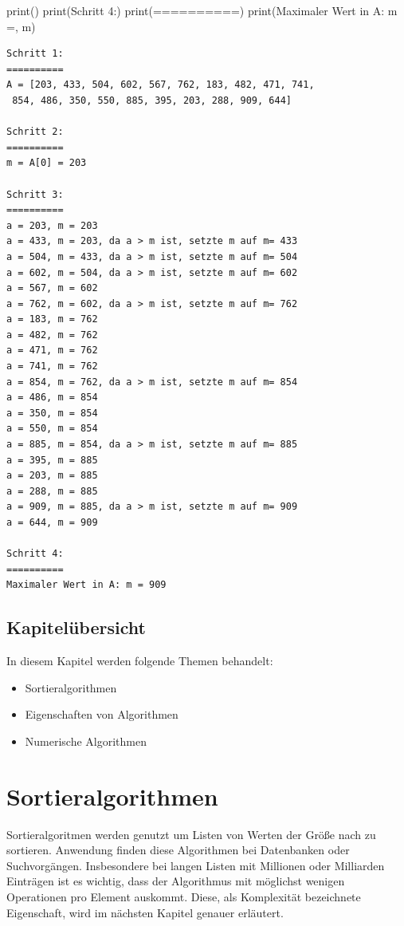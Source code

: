 \documentclass[
  letterpaper,
  DIV=11,
  numbers=noendperiod]{scrreprt}
\newenvironment{Shaded}{\begin{snugshade}}{\end{snugshade}}
\newcommand{\BuiltInTok}[1]{\textcolor[rgb]{0.00,0.23,0.31}{#1}}
\newcommand{\NormalTok}[1]{\textcolor[rgb]{0.00,0.23,0.31}{#1}}
\newcommand{\StringTok}[1]{\textcolor[rgb]{0.13,0.47,0.30}{#1}}
\providecommand{\tightlist}{%
  \setlength{\itemsep}{0pt}\setlength{\parskip}{0pt}}\usepackage{longtable,booktabs,array}
\begin{document}
\begin{Shaded}
\begin{Highlighting}[]
\BuiltInTok{print}\NormalTok{()}
\BuiltInTok{print}\NormalTok{(}\StringTok{\textquotesingle{}Schritt 4:\textquotesingle{}}\NormalTok{)}
\BuiltInTok{print}\NormalTok{(}\StringTok{\textquotesingle{}==========\textquotesingle{}}\NormalTok{)}
\BuiltInTok{print}\NormalTok{(}\StringTok{\textquotesingle{}Maximaler Wert in A: m =\textquotesingle{}}\NormalTok{, m)}
\end{Highlighting}
\end{Shaded}

\begin{verbatim}
Schritt 1:
==========
A = [203, 433, 504, 602, 567, 762, 183, 482, 471, 741,
 854, 486, 350, 550, 885, 395, 203, 288, 909, 644]

Schritt 2:
==========
m = A[0] = 203

Schritt 3:
==========
a = 203, m = 203
a = 433, m = 203, da a > m ist, setzte m auf m= 433
a = 504, m = 433, da a > m ist, setzte m auf m= 504
a = 602, m = 504, da a > m ist, setzte m auf m= 602
a = 567, m = 602
a = 762, m = 602, da a > m ist, setzte m auf m= 762
a = 183, m = 762
a = 482, m = 762
a = 471, m = 762
a = 741, m = 762
a = 854, m = 762, da a > m ist, setzte m auf m= 854
a = 486, m = 854
a = 350, m = 854
a = 550, m = 854
a = 885, m = 854, da a > m ist, setzte m auf m= 885
a = 395, m = 885
a = 203, m = 885
a = 288, m = 885
a = 909, m = 885, da a > m ist, setzte m auf m= 909
a = 644, m = 909

Schritt 4:
==========
Maximaler Wert in A: m = 909
\end{verbatim}

\section{Kapitelübersicht}\label{kapiteluxfcbersicht}

In diesem Kapitel werden folgende Themen behandelt:

\begin{itemize}
\tightlist
\item
  Sortieralgorithmen
\item
  Eigenschaften von Algorithmen
\item
  Numerische Algorithmen
\end{itemize}

\chapter{Sortieralgorithmen}\label{sortieralgorithmen}

Sortieralgoritmen werden genutzt um Listen von Werten der Größe nach zu
sortieren. Anwendung finden diese Algorithmen bei Datenbanken oder
Suchvorgängen. Insbesondere bei langen Listen mit Millionen oder
Milliarden Einträgen ist es wichtig, dass der Algorithmus mit möglichst
wenigen Operationen pro Element auskommt. Diese, als Komplexität
bezeichnete Eigenschaft, wird im nächsten Kapitel genauer erläutert.
\end{document}
